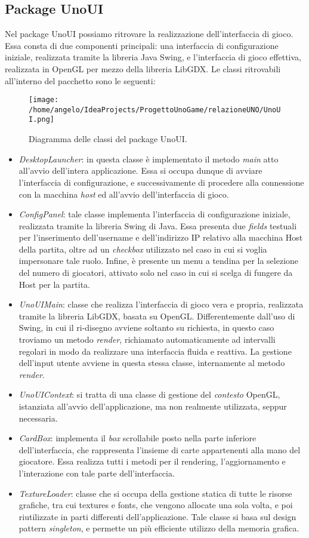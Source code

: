 \documentclass[11pt]{article} %
\begin{document}
\subsection{Package UnoUI}
Nel package UnoUI possiamo ritrovare la realizzazione dell'interfaccia di gioco. Essa consta di due componenti principali: una interfaccia di configurazione iniziale, realizzata tramite la libreria Java Swing, e l'interfaccia di gioco effettiva, realizzata in OpenGL per mezzo della libreria LibGDX. Le classi ritrovabili all'interno del pacchetto sono le seguenti:
\begin{figure}[h]
\centering%
\texttt{[image: /home/angelo/IdeaProjects/ProgettoUnoGame/relazioneUNO/UnoUI.png]}%
\caption{Diagramma delle classi del package UnoUI.}
\end{figure}
\begin{itemize}
	\item \emph{DesktopLauncher}: in questa classe è implementato il metodo \textit{main} atto all'avvio dell'intera applicazione. Essa si occupa dunque di avviare l'interfaccia di configurazione, e successivamente di procedere alla connessione con la macchina \textit{host} ed all'avvio dell'interfaccia di gioco.
	\item \emph{ConfigPanel}: tale classe implementa l'interfaccia di configurazione iniziale, realizzata tramite la libreria Swing di Java. Essa presenta due \textit{fields} testuali per l'inserimento dell'username e dell'indirizzo IP relativo alla macchina Host della partita, oltre ad un \textit{checkbox} utilizzato nel caso in cui si voglia impersonare tale ruolo. Infine, è presente un menu a tendina per la selezione del numero di giocatori, attivato solo nel caso in cui si scelga di fungere da Host per la partita.
	\item \emph{UnoUIMain}: classe che realizza l'interfaccia di gioco vera e propria, realizzata tramite la libreria LibGDX, basata su OpenGL. Differentemente dall'uso di Swing, in cui il ri-disegno avviene soltanto su richiesta, in questo caso troviamo un metodo \textit{render}, richiamato automaticamente ad intervalli regolari in modo da realizzare una interfaccia fluida e reattiva. La gestione dell'input utente avviene in questa stessa classe, internamente al metodo \textit{render}.
	\item \emph{UnoUIContext}: si tratta di una classe di gestione del \textit{contesto} OpenGL, istanziata all'avvio dell'applicazione, ma non realmente utilizzata, seppur necessaria.
	\item \emph{CardBox}: implementa il \textit{box} scrollabile posto nella parte inferiore dell'interfaccia, che rappresenta l'insieme di carte appartenenti alla mano del giocatore. Essa realizza tutti i metodi per il rendering, l'aggiornamento e l'interazione con tale parte dell'interfaccia.
	\item \emph{TextureLoader}: classe che si occupa della gestione statica di tutte le risorse grafiche, tra cui textures e fonts, che vengono allocate una sola volta, e poi riutilizzate in parti differenti dell'applicazione. Tale classe si basa sul design pattern \textit{singleton}, e permette un più efficiente utilizzo della memoria grafica. 
\end{itemize}
\end{document}
